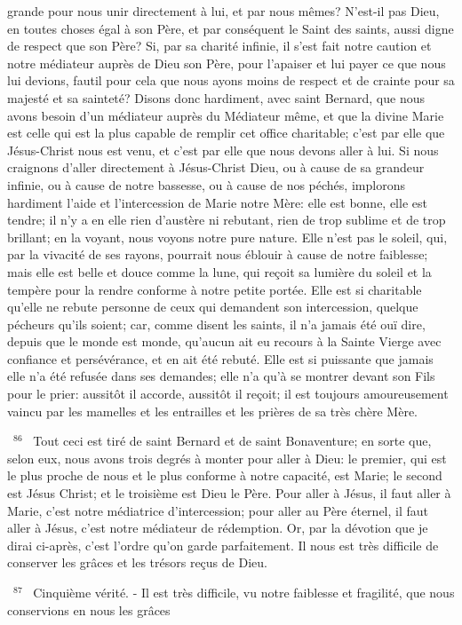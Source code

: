 \documentclass[paper=a5,pagesize=pdftex,fontsize=15pt,headinclude=on,twoside=off]{scrbook}
\newcommand{\negphantom}[1]{\settowidth{\dimen0}{#1}\hspace*{-\dimen0}}
\newcommand{\versenb}[1]{\par \vspace{10pt}~\negphantom{~${}^{#1}$~}${}^{#1}$~}
\begin{document}
grande pour nous unir directement à lui, et par nous mêmes? N'est-il pas Dieu, en toutes choses égal à son Père,
et par conséquent le Saint des saints, aussi digne de respect que son Père? Si, par sa charité infinie, il s'est fait
notre caution et notre médiateur auprès de Dieu son Père, pour l'apaiser et lui payer ce que nous lui devions, fautil pour cela que nous ayons moins de respect et de crainte pour sa majesté et sa sainteté?
Disons donc hardiment, avec saint Bernard, que nous avons besoin d'un médiateur auprès du Médiateur même, et
que la divine Marie est celle qui est la plus capable de remplir cet office charitable; c'est par elle que Jésus-Christ
nous est venu, et c'est par elle que nous devons aller à lui. Si nous craignons d'aller directement à Jésus-Christ
Dieu, ou à cause de sa grandeur infinie, ou à cause de notre bassesse, ou à cause de nos péchés, implorons
hardiment l'aide et l'intercession de Marie notre Mère: elle est bonne, elle est tendre; il n'y a en elle rien d'austère
ni rebutant, rien de trop sublime et de trop brillant; en la voyant, nous voyons notre pure nature. Elle n'est pas le
soleil, qui, par la vivacité de ses rayons, pourrait nous éblouir à cause de notre faiblesse; mais elle est belle et
douce comme la lune, qui reçoit sa lumière du soleil et la tempère pour la rendre conforme à notre petite portée.
Elle est si charitable qu'elle ne rebute personne de ceux qui demandent son intercession, quelque pécheurs qu'ils
soient; car, comme disent les saints, il n'a jamais été ouï dire, depuis que le monde est monde, qu'aucun ait eu
recours à la Sainte Vierge avec confiance et persévérance, et en ait été rebuté. Elle est si puissante que jamais
elle n'a été refusée dans ses demandes; elle n'a qu'à se montrer devant son Fils pour le prier: aussitôt il accorde,
aussitôt il reçoit; il est toujours amoureusement vaincu par les mamelles et les entrailles et les prières de sa très
chère Mère.
\versenb{86} Tout ceci est tiré de saint Bernard et de saint Bonaventure; en sorte que, selon eux, nous avons trois degrés à
monter pour aller à Dieu: le premier, qui est le plus proche de nous et le plus conforme à notre capacité, est Marie;
le second est Jésus Christ; et le troisième est Dieu le Père. Pour aller à Jésus, il faut aller à Marie, c'est notre
médiatrice d'intercession; pour aller au Père éternel, il faut aller à Jésus, c'est notre médiateur de rédemption. Or,
par la dévotion que je dirai ci-après, c'est l'ordre qu'on garde parfaitement.
Il nous est très difficile de conserver les grâces et les trésors reçus de Dieu.
\versenb{87} Cinquième vérité. - Il est très difficile, vu notre faiblesse et fragilité, que nous conservions en nous les grâces
\end{document}

